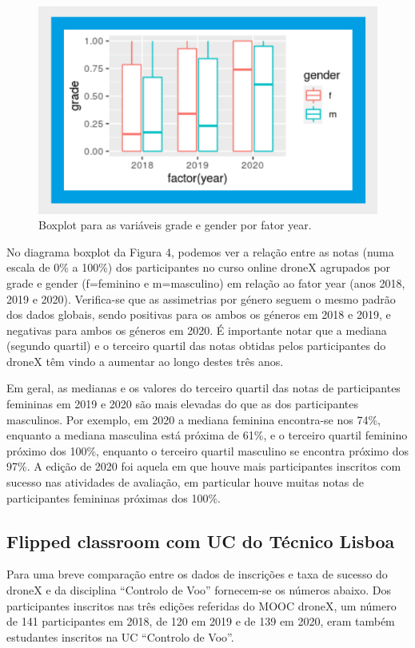 \begin{figure}
    \centering
    \includegraphics[width=.9\textwidth]{chaps/Images/boxplot_gender_drone.png}
    \caption{Boxplot para as variáveis grade e gender por fator year.}
    \label{fig:boxplot_gender_dronex}
\end{figure}

No diagrama boxplot da Figura 4, podemos ver a
relação entre as notas (numa escala de 0\% a
100\%) dos participantes no curso online droneX agrupados por grade e gender (f=feminino e m=masculino) em relação ao fator year (anos 2018, 2019 e 2020). Verifica-se que as assimetrias por género seguem o mesmo padrão dos dados globais, sendo positivas para os ambos os géneros em 2018 e 2019, e negativas para ambos os géneros em 2020. É importante notar que a mediana (segundo quartil) e o terceiro quartil das notas obtidas pelos participantes do droneX têm vindo a aumentar ao longo destes três anos.

Em geral, as medianas e os valores do terceiro quartil das notas de participantes femininas em 2019 e 2020 são mais elevadas do que as dos participantes masculinos. Por exemplo, em 2020 a mediana feminina encontra-se nos 74\%,
enquanto a mediana masculina está próxima de 61\%, e o terceiro quartil feminino próximo dos 100\%, enquanto o terceiro quartil masculino se encontra próximo dos 97\%. A edição de 2020 foi aquela em que houve mais participantes inscritos com sucesso nas atividades de avaliação, em particular houve muitas notas de participantes femininas próximas dos 100\%.

\subsection{Flipped classroom com
UC do Técnico Lisboa}

Para uma breve comparação entre os dados de inscrições e taxa de sucesso do droneX e da disciplina “Controlo de Voo” fornecem-se os
números abaixo. Dos participantes inscritos nas três edições referidas do MOOC droneX, um
número de 141 participantes em 2018, de 120 em 2019 e de 139 em 2020, eram também estudantes inscritos na UC “Controlo de Voo”.

